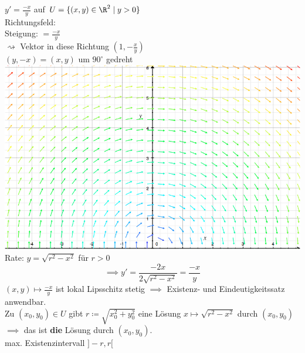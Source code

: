 \begin{bsp}
	$y' = \frac{-x}{y}$ auf $U = \{ (x,y) \in \R^2 \mid y > 0 \}$ \\
	Richtungsfeld: \\
	Steigung: $= \frac{-x}{y}$ \\
	$\rightsquigarrow$ Vektor in diese Richtung $( 1 , - \frac{x}{y} )$ \\
	$( y , -x ) = (x,y)$ um $90^\circ$ gedreht \\
	\includegraphics[width=\textwidth]{Bild1} \\
	Rate: $y = \sqrt{r^2 - x^2}$ für $r > 0$
	\[ \implies y' = \frac{-2x}{2 \sqrt{r^2 - x^2}} = \frac{-x}{y} \]
	$(x,y) \mapsto \frac{-x}{y}$ ist lokal Lipsschitz stetig $\implies$ Existenz- und Eindeutigkeitssatz anwendbar. \\
	Zu $(x_0 , y_0) \in U$ gibt $r \coloneqq \sqrt{x_0^2 + y_0^2}$ eine Lösung $x \mapsto \sqrt{r^2 - x^2}$ durch $(x_0 , y_0)$ \\
	$\implies$ das ist \textbf{die} Lösung durch $(x_0 , y_0)$. \\
	max. Existenzintervall $]-r , r [$
\end{bsp}
